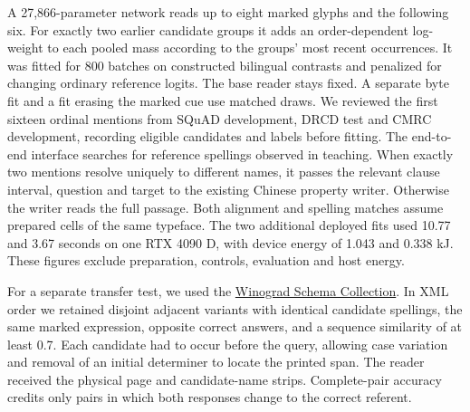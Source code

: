 A 27,866-parameter network reads up to eight marked glyphs and the following six. For exactly two earlier candidate groups it adds an order-dependent log-weight to each pooled mass according to the groups' most recent occurrences. It was fitted for 800 batches on constructed bilingual contrasts and penalized for changing ordinary reference logits. The base reader stays fixed. A separate byte fit and a fit erasing the marked cue use matched draws. We reviewed the first sixteen ordinal mentions from SQuAD development, DRCD test and CMRC development, recording eligible candidates and labels before fitting. The end-to-end interface searches for reference spellings observed in teaching. When exactly two mentions resolve uniquely to different names, it passes the relevant clause interval, question and target to the existing Chinese property writer. Otherwise the writer reads the full passage. Both alignment and spelling matches assume prepared cells of the same typeface. The two additional deployed fits used 10.77 and 3.67 seconds on one RTX 4090 D, with device energy of 1.043 and 0.338 kJ. These figures exclude preparation, controls, evaluation and host energy.

For a separate transfer test, we used the \href{https://cs.nyu.edu/~davise/papers/WinogradSchemas/WSCollection.html}{Winograd Schema Collection}. In XML order we retained disjoint adjacent variants with identical candidate spellings, the same marked expression, opposite correct answers, and a sequence similarity of at least 0.7. Each candidate had to occur before the query, allowing case variation and removal of an initial determiner to locate the printed span. The reader received the physical page and candidate-name strips. Complete-pair accuracy credits only pairs in which both responses change to the correct referent.
